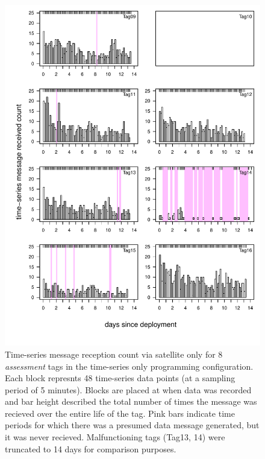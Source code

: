 \documentclass{article}
\begin{document}
\begin{figure}[h!]
\centering
\includegraphics{figure_s1.pdf}
\caption{Time-series message reception count via satellite only for 8 \emph{assessment} tags in the time-series only programming configuration. Each block represnts 48 time-series data points (at a sampling period of 5 minutes). Blocks are placed at when data was recorded and bar height described the total number of times the message was recieved over the entire life of the tag. Pink bars indicate time periods for which there was a presumed data message generated, but it was never recieved. Malfunctioning tags (Tag13, 14) were truncated to 14 days for comparison purposes.}
\end{figure}
\end{document}
